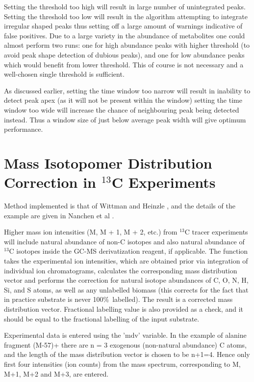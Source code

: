 Setting the threshold too high will result in large number of unintegrated 
peaks. Setting the threshold too low will result in the algorithm attempting 
to integrate irregular shaped peaks thus setting off a large amount of warnings 
indicative of false positives. Due to a large variety in the abundance of 
metabolites one could almost perform two runs: one for high abundance peaks 
with higher threshold (to avoid peak shape detection of dubious peaks), and one 
for low abundance peaks which would benefit from lower threshold. This of course 
is not necessary and a well-chosen single threshold is sufficient. 

As discussed earlier, setting the time window too narrow will result in 
inability to detect peak apex (as it will not be present within the window) 
setting the time window too wide will increase the chance of neighbouring peak 
being detected instead. Thus a window size of just below average peak width will 
give optimum performance.

\section{Mass Isotopomer Distribution Correction in $^{13}$C Experiments}


Method implemented is that of Wittman and Heinzle \cite{wittman99}, and the
details of the example are given in Nanchen et al \cite{nanchen07}. 

Higher mass ion intensities (M, M + 1, M + 2, etc.) from $^{13}$C tracer 
experiments will include natural abundance of non-C isotopes and also natural 
abundance of $^{13}$C isotopes inside the GC-MS derivatization reagent, if 
applicable. The function takes the experimental ion intensities, which are
obtained prior via integration of individual ion chromatograms, calculates
the corresponding mass distribution vector and performs the correction for
natural isotope abundances of C, O, N, H, Si, and S atoms, as well as any
unlabelled biomass (this corrects for the fact that in practice substrate
is never 100\%\ labelled). The result is a corrected mass distribution vector.
Fractional labelling value is also provided as a check, and it should be
equal to the fractional labelling of the input substrate.

Experimental data is entered using the 'mdv' variable. In the example of
alanine fragment (M-57)+ \cite{nanchen07} there are n = 3 exogenous (non-natural
abundance) C atoms, and the length of the mass distribution vector
is chosen to be n+1=4. Hence only first four intensities (ion counts)
from the mass spectrum, corresponding to M, M+1, M+2 and M+3, are entered.

